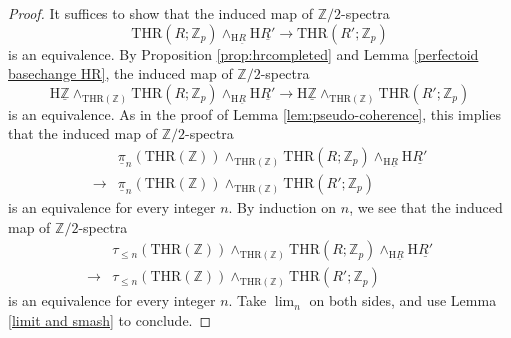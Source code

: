 \documentclass[10pt,a4paper]{amsart}
\newcommand{\THR}{\mathrm{THR}}
\newcommand{\Z}{\mathbb{Z}}
\newcommand{\rH}{\mathrm{H}}
\newcommand{\ul}{\underline}
\begin{document}
\begin{proof}
It suffices to show 
that the induced map of $\Z/2$-spectra
\[
\THR(R;\Z_p)
\wedge_{\rH \ul{R}}
\rH \ul{R'}
\to
\THR(R';\Z_p)
\]
is an equivalence.
By Proposition \ref{prop:hrcompleted} and Lemma \ref{perfectoid basechange HR},
the induced map of $\Z/2$-spectra
\[
\rH \ul{\Z}
\wedge_{\THR(\Z)}
\THR(R;\Z_p)
\wedge_{\rH \ul{R}}
\rH \ul{R'}
\to
\rH \ul{\Z}
\wedge_{\THR(\Z)}
\THR(R';\Z_p)
\]
is an equivalence.
As in the proof of Lemma \ref{lem:pseudo-coherence},
this implies that the induced map of $\Z/2$-spectra
\begin{align*}
&
\ul{\pi}_n(\THR(\Z))
\wedge_{\THR(\Z)}
\THR(R;\Z_p)
\wedge_{\rH \ul{R}}
\rH \ul{R'}
\\
\to
&
\ul{\pi}_n(\THR(\Z))
\wedge_{\THR(\Z)}
\THR(R';\Z_p)
\end{align*}
is an equivalence for every integer $n$.
By induction on $n$,
we see that the induced map of $\Z/2$-spectra
\begin{align*}
&
\tau_{\leq n}(\THR(\Z))
\wedge_{\THR(\Z)}
\THR(R;\Z_p)
\wedge_{\rH \ul{R}}
\rH \ul{R'}
\\
\to
&
\tau_{\leq n}(\THR(\Z))
\wedge_{\THR(\Z)}
\THR(R';\Z_p)
\end{align*}
is an equivalence for every integer $n$.
Take $\lim_n$ on both sides,
and use Lemma \ref{limit and smash} to conclude.
\end{proof}
\end{document}
